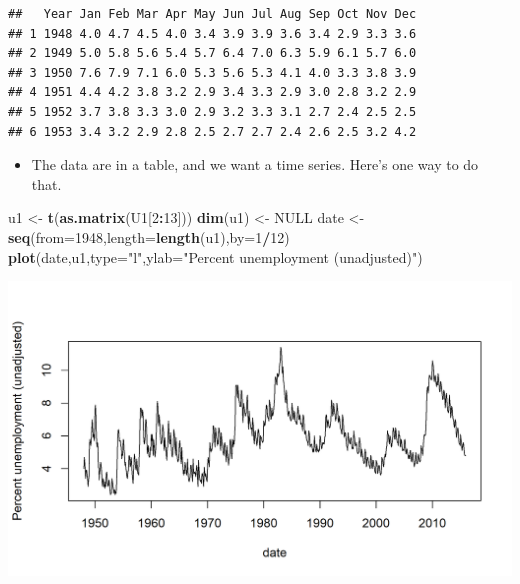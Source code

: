 \documentclass[]{article}
\newenvironment{Shaded}{\begin{snugshade}}{\end{snugshade}}
\newcommand{\KeywordTok}[1]{\textcolor[rgb]{0.13,0.29,0.53}{\textbf{#1}}}
\newcommand{\DataTypeTok}[1]{\textcolor[rgb]{0.13,0.29,0.53}{#1}}
\newcommand{\DecValTok}[1]{\textcolor[rgb]{0.00,0.00,0.81}{#1}}
\newcommand{\StringTok}[1]{\textcolor[rgb]{0.31,0.60,0.02}{#1}}
\newcommand{\OtherTok}[1]{\textcolor[rgb]{0.56,0.35,0.01}{#1}}
\newcommand{\OperatorTok}[1]{\textcolor[rgb]{0.81,0.36,0.00}{\textbf{#1}}}
\newcommand{\NormalTok}[1]{#1}
\providecommand{\tightlist}{%
  \setlength{\itemsep}{0pt}\setlength{\parskip}{0pt}}
\begin{document}
\begin{verbatim}
##   Year Jan Feb Mar Apr May Jun Jul Aug Sep Oct Nov Dec
## 1 1948 4.0 4.7 4.5 4.0 3.4 3.9 3.9 3.6 3.4 2.9 3.3 3.6
## 2 1949 5.0 5.8 5.6 5.4 5.7 6.4 7.0 6.3 5.9 6.1 5.7 6.0
## 3 1950 7.6 7.9 7.1 6.0 5.3 5.6 5.3 4.1 4.0 3.3 3.8 3.9
## 4 1951 4.4 4.2 3.8 3.2 2.9 3.4 3.3 2.9 3.0 2.8 3.2 2.9
## 5 1952 3.7 3.8 3.3 3.0 2.9 3.2 3.3 3.1 2.7 2.4 2.5 2.5
## 6 1953 3.4 3.2 2.9 2.8 2.5 2.7 2.7 2.4 2.6 2.5 3.2 4.2
\end{verbatim}

\begin{itemize}
\tightlist
\item
  The data are in a table, and we want a time series. Here's one way to
  do that.
\end{itemize}

\begin{Shaded}
\begin{Highlighting}[]
\NormalTok{u1 <-}\StringTok{ }\KeywordTok{t}\NormalTok{(}\KeywordTok{as.matrix}\NormalTok{(U1[}\DecValTok{2}\OperatorTok{:}\DecValTok{13}\NormalTok{]))}
\KeywordTok{dim}\NormalTok{(u1) <-}\StringTok{ }\OtherTok{NULL}
\NormalTok{date <-}\StringTok{ }\KeywordTok{seq}\NormalTok{(}\DataTypeTok{from=}\DecValTok{1948}\NormalTok{,}\DataTypeTok{length=}\KeywordTok{length}\NormalTok{(u1),}\DataTypeTok{by=}\DecValTok{1}\OperatorTok{/}\DecValTok{12}\NormalTok{)}
\KeywordTok{plot}\NormalTok{(date,u1,}\DataTypeTok{type=}\StringTok{"l"}\NormalTok{,}\DataTypeTok{ylab=}\StringTok{"Percent unemployment (unadjusted)"}\NormalTok{)}
\end{Highlighting}
\end{Shaded}

\begin{center}\includegraphics{figure/intro-reshape-1} \end{center}
\end{document}
